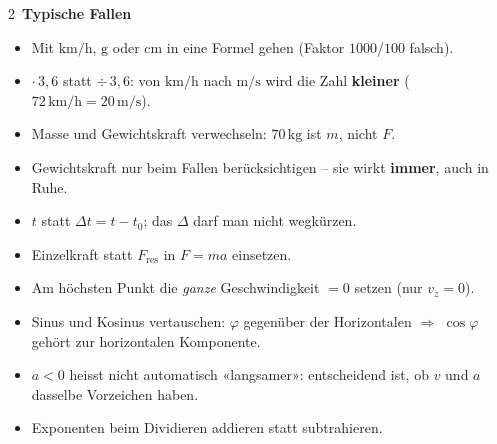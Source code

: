 \documentclass[8pt,a4paper]{extarticle}
\newcommand{\T}[1]{%
  \vspace{2.2mm plus 0.6mm}%
  \noindent\colorbox{ak}{\color{white}\bfseries\small\,#1\,}\par
  \vspace{0.8mm}\nobreak\ignorespaces}
\begin{document}
\begin{multicols}{2}
\T{Typische Fallen}

\begin{itemize}\itemsep0.3mm   
\item Mit $\mathrm{km/h}$, $\mathrm{g}$ oder $\mathrm{cm}$ in eine Formel gehen (Faktor $1000$/$100$ falsch).
\item $\cdot\,3{,}6$ statt $\div\,3{,}6$: von $\mathrm{km/h}$ nach $\mathrm{m/s}$ wird die Zahl \textbf{kleiner} ($72\,\mathrm{km/h}=20\,\mathrm{m/s}$).
\item Masse und Gewichtskraft verwechseln: $70\,\mathrm{kg}$ ist $m$, nicht $F$.
\item Gewichtskraft nur beim Fallen berücksichtigen – sie wirkt \textbf{immer}, auch in Ruhe.
\item $t$ statt $\Delta t = t-t_0$; das $\Delta$ darf man nicht wegkürzen.
\item Einzelkraft statt $F_{\text{res}}$ in $F=ma$ einsetzen.
\item Am höchsten Punkt die \emph{ganze} Geschwindigkeit $=0$ setzen (nur $v_z=0$).
\item Sinus und Kosinus vertauschen: $\varphi$ gegenüber der Horizontalen $\Rightarrow$ $\cos\varphi$ gehört zur horizontalen Komponente.
\item $a<0$ heisst nicht automatisch «langsamer»: entscheidend ist, ob $v$ und $a$ dasselbe Vorzeichen haben.
\item Exponenten beim Dividieren addieren statt subtrahieren.
\end{itemize}

\end{multicols}
\end{document}
